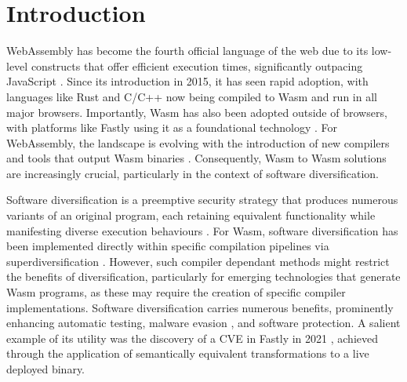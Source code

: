 \documentclass[sigplan,screen]{acmart}
\newcommand{\wasm}{Wasm\xspace}
\newcommand{\Wasm}{WebAssembly\xspace}
\begin{document}

\section{Introduction}

\Wasm has become the fourth official language of the web due to its low-level constructs that offer efficient execution times, significantly outpacing JavaScript \cite{haas2017bringing, WebAssemblyCoreSpecification}. 
Since its introduction in 2015, it has seen rapid adoption, with languages like Rust and C/C++ now being compiled to \wasm and run in all major browsers. 
Importantly, \wasm has also been adopted outside of browsers, with platforms like Fastly using it as a foundational technology \cite{fastly}.
For \Wasm, the landscape is evolving with the introduction of new compilers and tools that output \wasm binaries \cite{hilbig2021empirical, javy, kmm}.
Consequently, \wasm to \wasm solutions are increasingly crucial, particularly in the context of software diversification.

Software diversification is a preemptive security strategy that produces numerous variants of an original program, each retaining equivalent functionality while manifesting diverse execution behaviours \cite{cohen1993operating, 4197960, 595185}. 
For \wasm, software diversification has been implemented directly within specific compilation pipelines via superdiversification \cite{arteaga2020crow, MEWE}. 
However, such compiler dependant methods might restrict the benefits of diversification, particularly for emerging technologies that generate \wasm programs, as these may require the creation of specific compiler implementations. 
Software diversification carries numerous benefits, prominently enhancing automatic testing, malware evasion \cite{CABRERAARTEAGA2023103296}, and software protection. 
A salient example of its utility was the discovery of a CVE in Fastly in 2021 \cite{CVE}, achieved through the application of semantically equivalent transformations to a live deployed binary.
\end{document}

